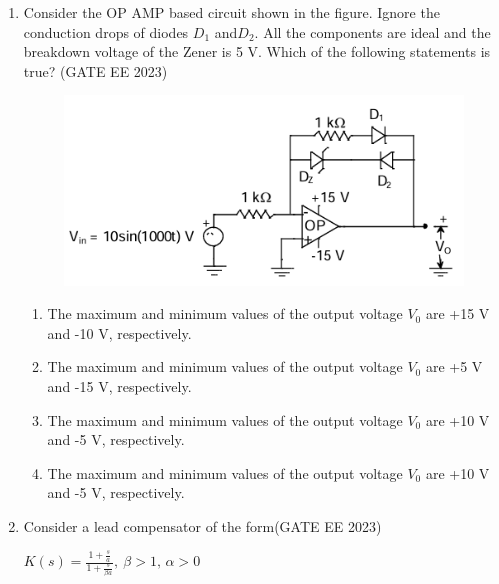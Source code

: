 \documentclass[a4paper,12pt]{exam}
\theoremstyle{remark}
\begin{document}
\begin{enumerate}
\begin{multicols}{4}
\begin{enumerate}
    \item $2.51 e^{-0.032s}$
    \item $\frac{e^{-2.514s}}{s+1}$
    \item $1.04 e^{-2.514s}$
    \item $2.51 e^{-1.047s}$
\end{enumerate}
\end{multicols}
\item Consider the OP AMP based circuit shown in the figure. Ignore the conduction 
drops of diodes $ D_{1}$ and$ D_{2}$. All the components are ideal and the breakdown voltage of the Zener is 5 V. Which of the following statements is true? \hfill{(GATE EE 2023)}
\begin{figure}[H]
    \centering
    \includegraphics[width=0.5\columnwidth]{figs/Q 37.png}
    \caption{}
    \label{fig:placeholder}
\end{figure}
\begin{enumerate}
    \item The maximum and minimum values of the output voltage $V_{0}$ are +15 V and -10 V, respectively.
    \item The maximum and minimum values of the output voltage $V_{0}$ are +5 V and -15 V, 
respectively. 
    \item The maximum and minimum values of the output voltage $V_{0}$ are +10 V and -5 V, 
respectively. 
    \item The maximum and minimum values of the output voltage $V_{0}$ are +10 V and -5 V, 
respectively. 
\end{enumerate}
\newpage
\item Consider a lead compensator of the form\hfill{(GATE EE 2023)}

$
K(s) = \frac{1 + \frac{s}{a}}{1 + \frac{s}{\beta a}},\ \beta > 1,\, \alpha > 0
$


\end{enumerate}
\end{document}
